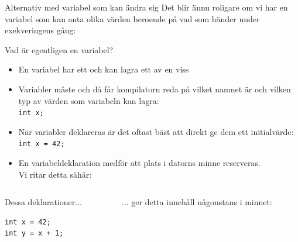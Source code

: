 \documentclass{lecturenotes}
\begin{document}
\begin{Slide}{Alternativ med variabel som kan ändra sig}
\footnotesize
Det blir ännu roligare om vi har en variabel som kan anta olika värden beroende på vad som händer under exekveringens gång:

\end{Slide}


\begin{Slide}{Vad är egentligen en variabel?}\scriptsize
\begin{itemize}
\item En variabel har ett  och kan lagra ett  av en viss 
\item Variabler måste   och då får kompilatorn reda på vilket namnet är och vilken typ av värden som variabeln kan lagra: \\ \lstinline{int x; }
\item När variabler deklareras är det oftast bäst att direkt ge dem ett initialvärde:  \\ \lstinline{int x = 42; }
\item En variabeldeklaration medför att plats i datorns minne reserveras. \\Vi ritar detta såhär: \\ 
\end{itemize}

\begin{columns}
\begin{column}{0.3\textwidth}
Dessa deklarationer...
\begin{lstlisting}
int x = 42;    
int y = x + 1;   
\end{lstlisting}
\end{column}
\begin{column}{0.5\textwidth}
... ger detta innehåll någonstans i minnet:

\end{column}
\end{columns}
\end{Slide}
\end{document}
